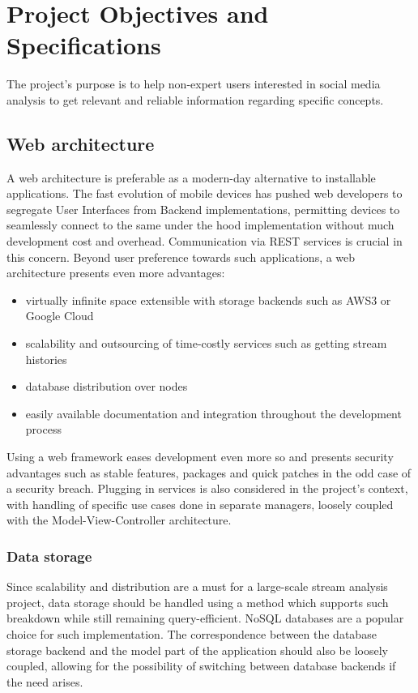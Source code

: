 \chapter{Project Objectives and Specifications}
The project's purpose is to help non-expert users interested in social media analysis to get relevant and reliable information regarding specific concepts. 

\section{Web architecture}
A web architecture is preferable as a modern-day alternative to installable applications. The fast evolution of mobile devices has pushed web developers to segregate User Interfaces from Backend implementations, permitting devices to seamlessly connect to the same under the hood implementation without much development cost and overhead. Communication via REST services is crucial in this concern. Beyond user preference towards such applications, a web architecture presents even more advantages:

\begin{itemize}
\item virtually infinite space extensible with storage backends such as AWS3 or Google Cloud
\item scalability and outsourcing of time-costly services such as getting stream histories
\item database distribution over nodes
\item easily available documentation and integration throughout the development process
\end{itemize} 

Using a web framework eases development even more so and presents security advantages such as stable features, packages and quick patches in the odd case of a security breach. Plugging in services is also considered in the project's context, with handling of specific use cases done in separate managers, loosely coupled with the Model-View-Controller architecture.

\subsection{Data storage}
Since scalability and distribution are a must for a large-scale stream analysis project, data storage should be handled using a method which supports such breakdown while still remaining query-efficient. NoSQL databases are a popular choice for such implementation. The correspondence between the database storage backend and the model part of the application should also be loosely coupled, allowing for the possibility of switching between database backends if the need arises.

